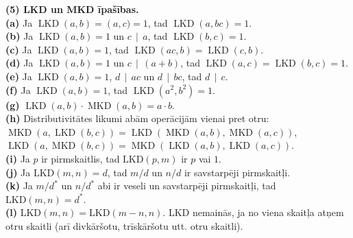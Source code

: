 \documentclass[a4paper,12pt]{article}
\begin{document}
{\bf (5) LKD un MKD īpašības.}\\
{\bf (a)} Ja $\operatorname{LKD}(a,b)=\operatorname(a,c)=1$, tad 
$\operatorname{LKD}(a,bc)=1$.\\
{\bf (b)} Ja $\operatorname{LKD}(a,b)=1$ un $c\,\mid\,a$, tad 
$\operatorname{LKD}(b,c)=1$.\\
{\bf (c)} Ja $\operatorname{LKD}(a,b)=1$, tad $\operatorname{LKD}(ac,b)
= \operatorname{LKD}(c,b)$.\\
{\bf (d)} Ja $\operatorname{LKD}(a,b)=1$ un $c\,\mid\,(a+b)$, tad
$\operatorname{LKD}(a,c) = \operatorname{LKD}(b,c)=1$.\\
{\bf (e)} Ja $\operatorname{LKD}(a,b)=1$, $d\,\mid\,ac$ un 
$d\,\mid\,bc$, tad $d\,\mid\,c$.\\
{\bf (f)} Ja $\operatorname{LKD}(a,b)=1$, 
tad $\operatorname{LKD}\left(a^2,b^2\right)=1$.\\
{\bf (g)} $\operatorname{LKD}(a,b)\cdot\operatorname{MKD}(a,b)=a \cdot b$.\\
{\bf (h)} Distributivitātes likumi abām operācijām vienai pret otru:\\
\mbox{}\hspace{20pt}$\operatorname{MKD}(a,\operatorname{LKD}(b,c)) = \operatorname{LKD}(\operatorname{MKD}(a,b),\operatorname{MKD}(a,c))$,\\
\mbox{}\hspace{20pt}$\operatorname{LKD}(a,\operatorname{MKD}(b,c)) = \operatorname{MKD}(\operatorname{LKD}(a,b),\operatorname{LKD}(a,c))$.\\
{\bf (i)} Ja $p$ ir pirmskaitlis, tad $\text{LKD}(p,m)$ ir 
$p$ vai $1$.\\
{\bf (j)} Ja $\text{LKD}(m,n) = d$, tad $m/d$ un $n/d$ ir
savstarpēji pirmskaitļi.\\
{\bf (k)} Ja $m/d^{\ast}$ un $n/d^{\ast}$ abi ir veseli 
un savstarpēji pirmskaitļi, tad 
$\text{LKD}(m,n) = d^{\ast}$.\\
{\bf (l)} $\text{LKD}(m,n) = \text{LKD}(m-n,n)$. LKD
nemainās, ja no viena skaitļa atņem otru skaitli 
(arī divkāršotu, trīskāršotu utt. otru skaitli).
\end{document}
